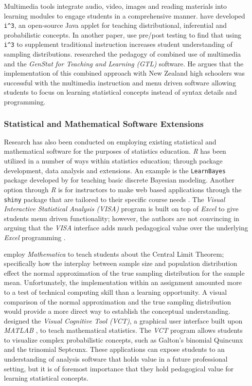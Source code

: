 \documentclass[11pt]{isuthesis}
\begin{document}
Multimedia tools integrate audio, video, images and reading materials into learning modules to engage students in a comprehensive manner. \citet{McDanielGreen2012Paper1} have developed \texttt{i\string^3}, an open-source Java applet for teaching distributional, inferential and probabilistic concepts.  In another paper, \citet{McDanielGreen2012Paper2} use pre/post testing to find that using \texttt{i\string^3} to supplement traditional instruction increases student understanding of sampling distributions. \citet{Harraway2012} researched the pedagogy of combined use of multimedia and the \textit{GenStat for Teaching and Learning (GTL)} software. He argues that the implementation of this combined approach with New Zealand high schoolers was successful with the multimedia instruction and menu driven software allowing students to focus on learning statistical concepts instead of syntax details and programming.

\subsubsection{Statistical and Mathematical Software Extensions} 

Research has also been conducted on employing existing statistical and mathematical software for the purposes of statistics education. \textit{R} has been utilized in a number of ways within statistics education; through package development, data analysis and extensions. An example is the \texttt{LearnBayes} package \citep{LearnBayes} developed by \citet{Albert2009} for teaching basic discrete Bayesian modeling. Another option through \textit{R} is for instructors to make web based applications through the \texttt{shiny} package that are tailored to their specific course needs \citep{shiny}. The \textit{Visual Interactive Statistical Analysis (VISA)} program is built on top of \textit{Excel} \citep{Excel} to give students menu driven functionality; however, the authors are not convincing in arguing that the \textit{VISA} interface adds much pedagogical value over the underlying \textit{Excel} programming \citep{Shaltayev2010}. 

\citet{Hoff2012} employ \textit{Mathematica} \citep{Mathematica} to teach students about the  Central Limit Theorem; specifically how the interplay between sample size and population distribution effect the normal approximation of the true sampling distribution for the sample mean. Unfortunately, the implementation within an assignment amounted more to a test of technical computing skill than a learning opportunity. A visual comparison of the normal approximation and the true sampling distribution would provide a more direct way to establish the conceptual understanding.  \citet{Harlow2009} designed the \textit{Visual Cognitive Tool (VCT)}, a graphical user interface built upon \textit{MATLAB} \citep{MATLAB}, to teach mathematical statistics.  The \textit{VCT} program allows students to visualize complex probabilistic concepts, such as Galton's binomial Quincunx and the trinomial Septcunx. These applications can expose students to an understanding of analysis software that holds value in a future professional setting, but it is of foremost importance that they hold pedagogical value for learning statistical concepts.
\end{document}
